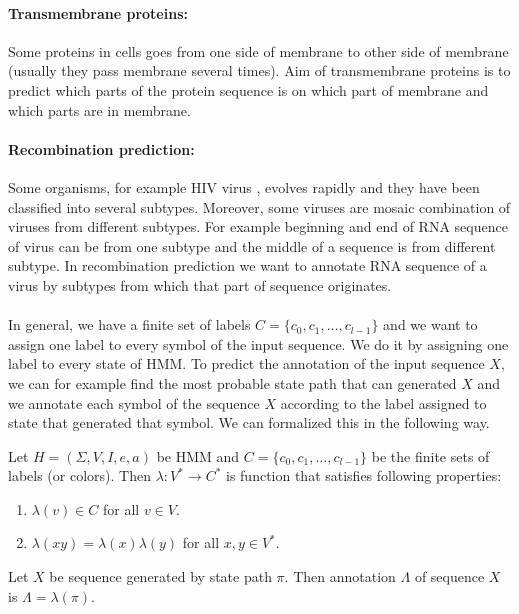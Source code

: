 \paragraph{Transmembrane proteins:} Some proteins in cells goes from one side of
membrane to other side of membrane (usually they pass membrane several times).
Aim of transmembrane proteins is to predict which parts of the protein sequence
is on which part of membrane and which parts are in membrane.

\paragraph{Recombination prediction:} Some organisms, for example HIV virus
, evolves rapidly and they have been classified into several subtypes.
Moreover, some viruses are mosaic combination of viruses from different
subtypes. For example beginning and end of RNA sequence of virus can be from 
one subtype and the middle of a sequence is from different subtype. In
recombination prediction we want to annotate RNA sequence of a virus by subtypes
from which that part of sequence originates.
\paragraph{} 
In general, we have a finite set of labels $C=\{c_0,c_1,\dots,c_{l-1}\}$ and we
want to assign one label to every symbol of the input sequence. We do it by
assigning one label to every state of HMM.
To predict the annotation of the input sequence $X$, we can for example find the
most probable state path that can generated $X$ and we annotate each symbol of
the sequence $X$ according to the label assigned to state that generated that
symbol. We can formalized this in the following way.


\begin{definition}\label{DEFINITION:ANNOTATION}
Let $H=(\Sigma,V,I,e,a)$ be HMM and $C=\{c_0,c_1,\dots,c_{l-1}\}$ be the finite
sets of labels (or colors). Then  
$\lambda: V^*\to C^*$ is function that satisfies following properties:
\begin{enumerate}
\item $\lambda(v)\in C$ for all $v\in V$.
\item $\lambda(xy) = \lambda(x)\lambda(y)$ for all $x,y\in V^*$.
\end{enumerate}

Let $X$ be sequence generated by state path $\pi$. Then annotation
$\Lambda$ of sequence $X$ is $\Lambda = \lambda(\pi)$.
\end{definition}

